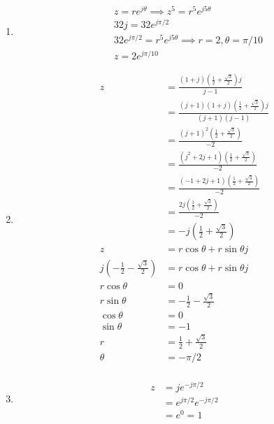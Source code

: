 \documentclass[10pt,a4paper, margin=1in]{article}
\begin{document}
\begin{enumerate}
\begin{enumerate}
        
    \item \begin{align*}
        & z = re^{j\theta} \implies z^5 = r^5e^{j5\theta} \\
        & 32j = 32e^{j\pi/2} \\
        & 32e^{j\pi/2} = r^5e^{j5\theta} \implies r = 2, \theta = \pi/10 \\
        & z = 2e^{j\pi/10}
    \end{align*}
    \item \begin{align*}
        z & = \frac{(1 + j) (\frac{1}{2} + \frac{\sqrt{3}}{2}) j}{j - 1} \\
        & = \frac{(j + 1) (1 + j) (\frac{1}{2} + \frac{\sqrt{3}}{2}) j}{(j + 1) (j - 1)} \\
        & = \frac{{(j + 1)}^2 (\frac{1}{2} + \frac{\sqrt{3}}{2})}{-2} \\
        & = \frac{(j^2 + 2j + 1) (\frac{1}{2} + \frac{\sqrt{3}}{2})}{-2} \\
        & = \frac{(-1 + 2j + 1) (\frac{1}{2} + \frac{\sqrt{3}}{2})}{-2} \\
        & = \frac{2j (\frac{1}{2} + \frac{\sqrt{3}}{2})}{-2} \\
        & = -j (\frac{1}{2} + \frac{\sqrt{3}}{2}) \\
        z & = r \cos\theta + r \sin\theta j \\
        j (- \frac{1}{2} - \frac{\sqrt{3}}{2}) & = r \cos\theta + r \sin\theta j \\
        r\cos\theta & = 0 \\
        r\sin\theta & = - \frac{1}{2} - \frac{\sqrt{3}}{2} \\
        \cos\theta & = 0 \\
        \sin\theta & = -1 \\
        r & = \frac{1}{2} + \frac{\sqrt{3}}{2} \\
        \theta & = -\pi/2 \\
    \end{align*}
    \item \begin{align*}
        z & = je^{-j\pi/2} \\
        & = e^{j\pi/2}e^{-j\pi/2} \\
        & = e^0 = 1
    \end{align*}
    \end{enumerate}


\end{enumerate}
\end{document}
